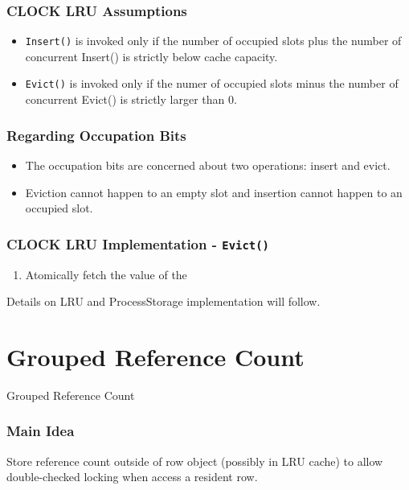 \documentclass{beamer}
\begin{document}
\begin{frame}
\frametitle{CLOCK LRU Assumptions}
\begin{itemize}
\item \texttt{Insert()} is invoked only if the number of occupied slots plus the 
  number of concurrent Insert() is strictly below cache capacity.
\item \texttt{Evict()} is invoked only if the numer of occupied slots minus the 
  number of concurrent Evict() is strictly larger than 0.
\end{itemize}
\end{frame}


\begin{frame}
\frametitle{Regarding Occupation Bits}
\begin{itemize}
\item The occupation bits are concerned about two operations: insert and evict.
\item Eviction cannot happen to an empty slot and insertion cannot happen to an 
occupied slot.
\end{itemize}
\end{frame}

\begin{frame}
\frametitle{CLOCK LRU Implementation - \texttt{Evict()}}

\begin{enumerate}
\item Atomically fetch the value of the 
\end{enumerate}
Details on LRU and ProcessStorage implementation will follow.
\end{frame}

\section{Grouped Reference Count}

\begin{frame}
Grouped Reference Count
\end{frame}


\begin{frame}
\frametitle{Main Idea}

Store reference count outside of row object (possibly in LRU cache) to allow 
double-checked locking when access a resident row.

\end{frame}
\end{document}
